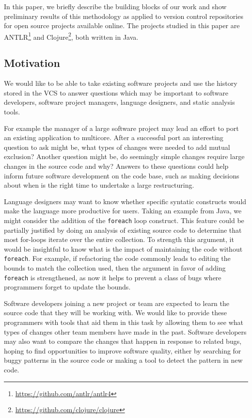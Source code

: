 In this paper, we briefly describe the building blocks of our work and show
preliminary results of this methodology as applied to version control
repositories for open source projects available online.  The projects studied
in this paper are ANTLR\footnote{\url{https://github.com/antlr/antlr4}} and
Clojure\footnote{\url{https://github.com/clojure/clojure}}, both written in
Java.

\subsection{Motivation}

We would like to be able to take existing software projects and use the history
stored in the VCS to answer questions which may be important to software
developers, software project managers, language designers, and static analysis
tools.

For example the manager of a large software project may lead an effort to port
an existing application to multicore.  After a successful port an interesting
question to ask might be, what types of changes were needed to add mutual
exclusion? Another question might be, do seemingly simple changes require large
changes in the source code and why?  Answers to these questions could help
inform future software development on the code base, such as making decisions
about when is the right time to undertake a large restructuring.

Language designers may want to know whether specific syntatic constructs would
make the language more productive for users. Taking an example from Java, we
might consider the addition of the {\tt foreach} loop construct. This feature
could be partially justified by doing an analysis of existing source code to
determine that most for-loops iterate over the entire collection. To strength
this argument, it would be insightful to know what is the impact of maintaining
the code without {\tt foreach}. For example, if refactoring the code commonly
leads to editing the bounds to match the collection used, then the argument in
favor of adding {\tt foreach} is strengthened, as now it helps to prevent a
class of bugs where programmers forget to update the bounds.

Software developers joining a new project or team are expected to learn the
source code that they will be working with. We would like to provide these
programmers with tools that aid them in this task by allowing them to see what
types of changes other team members have made in the past. Software developers
may also want to compare the changes that happen in response to related bugs,
hoping to find opportunities to improve software quality, either by searching
for buggy patterns in the source code or making a tool to detect the pattern in
new code.

